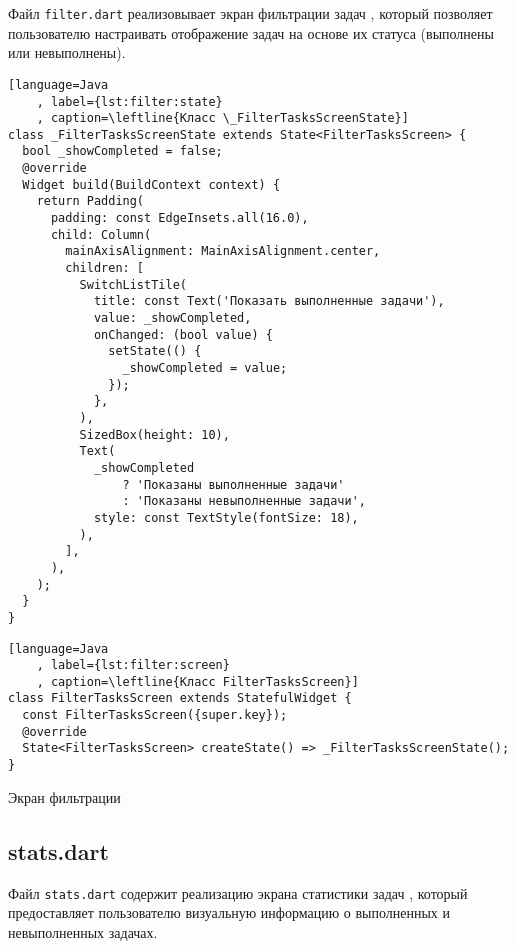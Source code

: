 Файл \texttt{filter.dart} 
реализовывает экран фильтрации задач ,
который позволяет пользователю настраивать отображение задач на основе
их статуса (выполнены или невыполнены).

\begin{lstlisting}[language=Java
	, label={lst:filter:state}
	, caption=\leftline{Класс \_FilterTasksScreenState}]
class _FilterTasksScreenState extends State<FilterTasksScreen> {
  bool _showCompleted = false;
  @override
  Widget build(BuildContext context) {
    return Padding(
      padding: const EdgeInsets.all(16.0),
      child: Column(
        mainAxisAlignment: MainAxisAlignment.center,
        children: [
          SwitchListTile(
            title: const Text('Показать выполненные задачи'),
            value: _showCompleted,
            onChanged: (bool value) {
              setState(() {
                _showCompleted = value;
              });
            },
          ),
          SizedBox(height: 10),
          Text(
            _showCompleted
                ? 'Показаны выполненные задачи'
                : 'Показаны невыполненные задачи',
            style: const TextStyle(fontSize: 18),
          ),
        ],
      ),
    );
  }
}
\end{lstlisting}

\break

\begin{lstlisting}[language=Java
	, label={lst:filter:screen}
	, caption=\leftline{Класс FilterTasksScreen}]
class FilterTasksScreen extends StatefulWidget {
  const FilterTasksScreen({super.key});
  @override
  State<FilterTasksScreen> createState() => _FilterTasksScreenState();
}
\end{lstlisting}

\begin{image}
	\caption{Экран фильтрации}
	\label{fig:filter}
\end{image}

\clearpage

\subsection{stats.dart}

Файл \texttt{stats.dart}  содержит реализацию экрана
статистики задач ,
который предоставляет пользователю визуальную информацию
о выполненных и невыполненных задачах.

